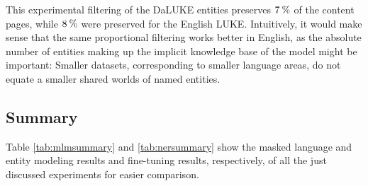 \documentclass[main.tex]{subfiles}
\begin{document}
This experimental filtering of the DaLUKE entities preserves $7\:\text{\%{}}$ of the content pages, while $8\:\text{\%{}}$ were preserved for the English LUKE.
Intuitively, it would make sense that the same proportional filtering works better in English, as the absolute number of entities making up the implicit knowledge base of the model might be important:
Smaller datasets, corresponding to smaller language areas, do not equate a smaller shared worlds of named entities.

\subsection{Summary} \label{subsec:preoverview}
Table \ref{tab:mlmsummary} and \ref{tab:nersummary} show the masked language and entity modeling results and fine-tuning results, respectively, of all the just discussed experiments for easier comparison.
\end{document}
